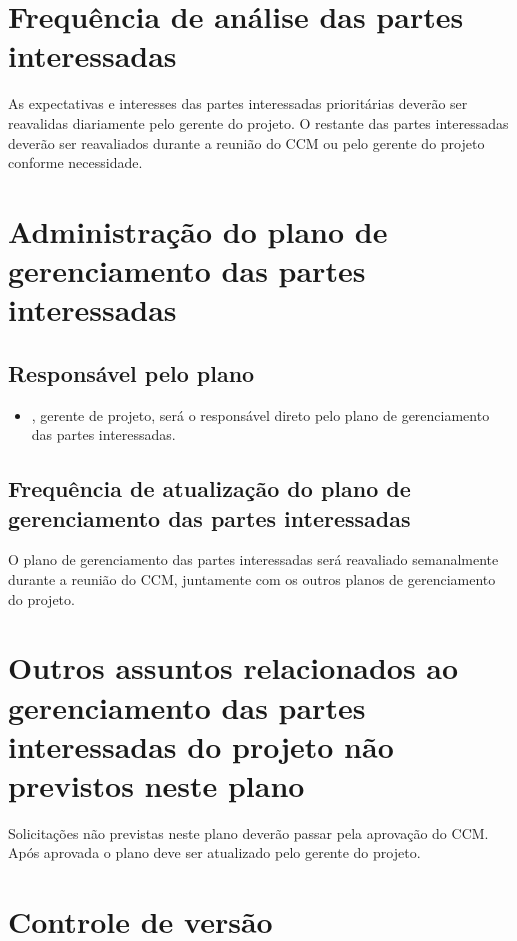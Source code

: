 \section{Frequência de análise das partes interessadas}

As expectativas e interesses das partes interessadas prioritárias deverão ser reavalidas diariamente pelo gerente do projeto. O restante das partes interessadas deverão ser reavaliados durante a reunião do CCM ou pelo gerente do projeto conforme necessidade.

\section{Administração do plano de gerenciamento das partes interessadas}

\subsection{Responsável pelo plano}

\begin{itemize}
	\item \projectManagerName{}, gerente de projeto, será o responsável direto pelo plano de gerenciamento das partes interessadas.
\end{itemize}

\subsection{Frequência de atualização do plano de gerenciamento das partes interessadas}

O plano de gerenciamento das partes interessadas será reavaliado semanalmente durante a reunião do CCM, juntamente com os outros planos de gerenciamento do projeto.

\section{Outros assuntos relacionados ao gerenciamento das partes interessadas do projeto não previstos neste plano}

Solicitações não previstas neste plano deverão passar pela aprovação do CCM. Após aprovada o plano deve ser atualizado pelo gerente do projeto.

\section{Controle de versão}

